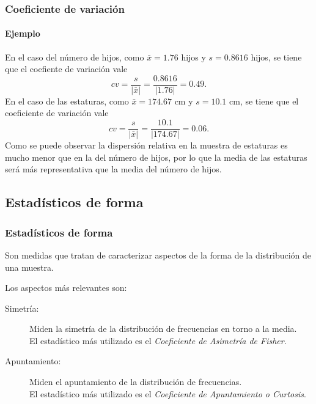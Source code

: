 \begin{frame}
\frametitle{Coeficiente de variación}
\framesubtitle{Ejemplo}
En el caso del número de hijos, como $\bar x=1.76$ hijos y $s=0.8616$ hijos, se tiene que el coefiente de variación vale
\[
cv = \frac{s}{|\bar x|} = \frac{0.8616}{|1.76|} = 0.49.
\]
En el caso de las estaturas, como $\bar x=174.67$ cm y $s=10.1$ cm, se tiene que el coeficiente de variación vale 
\[
cv = \frac{s}{|\bar x|} = \frac{10.1}{|174.67|} = 0.06.
\]
Como se puede observar la dispersión relativa en la muestra de estaturas es mucho menor que en la del número de hijos, por lo que la media
de las estaturas será más representativa que la media del número de hijos. 
\end{frame}


\subsection{Estadísticos de forma}
\begin{frame}
\frametitle{Estadísticos de forma}
Son medidas que tratan de caracterizar aspectos de la forma de la distribución de una muestra.

Los aspectos más relevantes son:
\begin{description}
\item[Simetría:] Miden la simetría de la distribución de frecuencias en torno a la media.\\
El estadístico más utilizado es el \emph{Coeficiente de Asimetría de Fisher}.
\item[Apuntamiento:] Miden el apuntamiento de la distribución de frecuencias.\\
El estadístico más utilizado es el \emph{Coeficiente de Apuntamiento o Curtosis}.
\end{description}
\end{frame}


